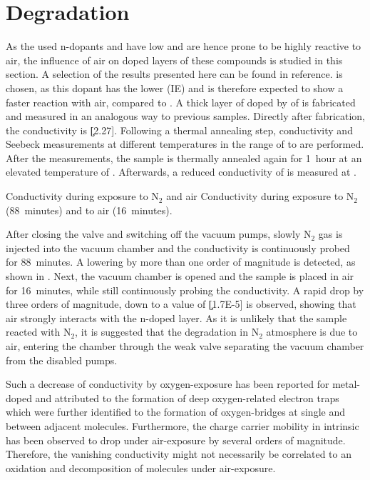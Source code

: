 \section{Degradation}%
\label{sec:ResPdkilling}
%
As the used n-dopants \CrPd and \WPd have low \IEs and are hence prone to be highly reactive to air, the influence of air on doped layers of these compounds is studied in this section. A selection of the results presented here can be found in reference\cite{TietzeMenke2013}. \WPd is chosen, as this dopant has the lower \IE (IE) and is therefore expected to show a faster reaction with air, compared to \CrPd. A  thick layer of \CS doped by \C[0.033] of \WPd is fabricated and measured in an analogous way to previous samples. Directly after fabrication, the conductivity is \c[2.27]. Following a thermal annealing step, conductivity and Seebeck measurements at different temperatures in the range of  to  are performed. After the measurements, the sample is thermally annealed again for 1~hour at an elevated temperature of . Afterwards, a reduced conductivity of  is measured at .

{Conductivity during exposure to N$_2$ and air}
{Conductivity during exposure to N$_2$ (88~minutes) and to air (16~minutes).}

After closing the valve and switching off the vacuum pumps, slowly N$_2$ gas is injected into the vacuum chamber and the conductivity is continuously probed for 88~minutes. A lowering by more than one order of magnitude is detected, as shown in . 
Next, the vacuum chamber is opened and the sample is placed in air for 16~minutes, while still continuously probing the conductivity. A rapid drop by three orders of magnitude, down to a value of \c[1.7E-5] is observed, showing that air strongly interacts with the n-doped layer. As it is unlikely that the sample reacted with N$_2$, it is suggested that the degradation in N$_2$ atmosphere is due to air, entering the chamber through the weak valve separating the vacuum chamber from the disabled pumps.

Such a decrease of conductivity by oxygen-exposure has been reported for metal-doped \CS and attributed to the formation of deep oxygen-related electron traps\cite{Fujimori1994} which were further identified to the formation of oxygen-bridges at single and between adjacent \CS molecules\cite{Tsetseris2010}. Furthermore, the charge carrier mobility in intrinsic \CS has been observed to drop under air-exposure by several orders of magnitude\cite{Konenkamp1999}. Therefore, the vanishing conductivity might not necessarily be correlated to an oxidation and decomposition of \WPd molecules under air-exposure.

